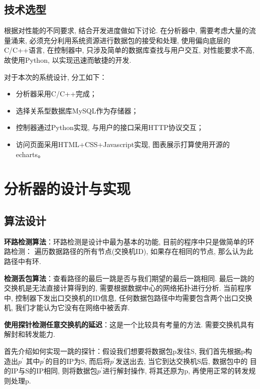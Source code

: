\section{技术选型}

根据对性能的不同要求, 结合开发进度做如下讨论. 在分析器中,
需要考虑大量的流量涌来, 必须充分利用系统资源进行数据包的接受和处理,
使用偏向底层的C/C++语言, 在控制器中, 只涉及简单的数据库查找与用户交互,
对性能要求不高, 故使用Python, 以实现迅速而敏捷的开发.

对于本次的系统设计, 分工如下：

\begin{itemize}
\item
  分析器采用C/C++完成；
\item
  选择关系型数据库MySQL作为存储器；
\item
  控制器通过Python实现, 与用户的接口采用HTTP协议交互；
\item
  访问页面采用HTML+CSS+Javascript实现, 图表展示打算使用开源的echarts。
\end{itemize}

\chapter{分析器的设计与实现}

\section{算法设计}
\label{sec:分析器主要算法说明}

\textbf{环路检测算法}：环路检测是设计中最为基本的功能, 目前的程序中只是做简单的环路检测：
 遍历数据路径的所有节点(交换机ID), 如果存在相同的节点, 那么认为此路径中有环.

\textbf{检测丢包算法}：查看路径的最后一跳是否与我们期望的最后一跳相同.
最后一跳的交换机是无法直接计算得到的, 需要根据数据中心的网络拓扑进行分析.
当前程序中, 控制器下发出口交换机的ID信息,
任何数据包路径中均需要包含两个出口交换机, 我们才能认为它没有在网络中被丢弃.


\textbf{使用探针检测任意交换机的延迟}：这是一个比较具有考量的方法.
需要交换机具有解封和转发能力.

首先介绍如何实现一跳的探针：假设我们想要将数据包p发往S,
我们首先根据p构造出\(p^{'}\) 其中\(p^{'}\)的目的IP为S,
而后将\(p^{'}\)发送出去, 当它到达交换机S后, 数据包中的
目的IP与S的IP相同, 则将数据包\(p^{'}\)进行解封操作, 将其还原为p,
再使用正常的转发规则处理p.

